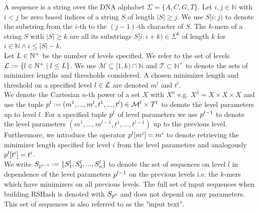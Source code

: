 \documentclass[a4paper,titlepage,onecolumn,oneside,12pt,nenglish,titlepage=firstiscover]{scrbook}
\theoremstyle{plain} %
\theoremstyle{definition} %
\theoremstyle{remark} %
\theoremstyle{plain}
\newcommand{\NN}{\mathbb{N}} %
\newcommand{\minimizerLength}{m}
\newcommand{\threshold}{t}
\newcommand{\level}{l}
\newcommand{\possibleMinimizerLengths}{\mathcal{M}}
\newcommand{\possibleThresholds}{\mathcal{T}}
\begin{document}
\newcommand{\sequences}[1]{S_{\levelParameters{#1}}}
\newcommand{\substring}[3]{#1[#2:#3)}
A sequence is a string over the DNA alphabet $\Sigma = \{A,C,G,T\}$. Let $i,j \in \NN$ with $i < j$ be zero based indices of a string $S$ of length $|S| \geq j$. We use $\substring{S}{i}{j}$ to denote the substring from the $i$-th to the $(j-1)$-th character of $S$.
The $k$-mers of a string $S$ with $|S|\geq k$ are all its substrings $S[i:i+k) \in \Sigma^k$ of length $k$ for $i \in \NN \wedge i \leq |S|-k$.\\
Let $\numberOfLevels \in \NN^+$ be the number of levels specified. We refer to the set of levels $\setOfLevels := \{ \level \in \NN^+ \mid \level \leq \numberOfLevels \}$. We use $\possibleMinimizerLengths \subseteq [1,k) \cap \NN$ and $\possibleThresholds \subset \NN^+$ to denote the sets of minimizer lengths and thresholds considered. A chosen minimizer length and threshold on a specified level $\level \in \setOfLevels$ are denoted $\minimizerLength^\level$ and $\threshold^\level$.\\
We denote the Cartesian $n$-th power of a set $X$ with $X^n$ e.g. $X^3 = X \times X \times X$ and use the tuple $\levelParameters{\level} := (\minimizerLength^1, ..., \minimizerLength^\level, \threshold^1, ..., \threshold^\level) \in \possibleMinimizerLengths^\level \times \possibleThresholds^\level$ to denote the level parameters up to level $\level$. For a specified tuple $\levelParameters{\level}$ of level parameters we use $\levelParameters{\level-1}$ to denote the level parameters $(\minimizerLength^1, ..., \minimizerLength^{\level-1}, \threshold^1, ..., \threshold^{\level-1})$ up to the previous level. Furthermore, we introduce the operator $\parameterAccess{\level}{\minimizerLength}{i} = \minimizerLength^i$ to denote retrieving the minimizer length specified for level $i$ from the level parameters and analogously $\parameterAccess{\level}{\threshold}{i}  = \threshold^i$.\\
We write $\sequences{\level-1} := \{S^\level_1,S^\level_2,...,S^\level_n\}$ to denote the set of sequences on level $\level$ in dependence of the level parameters $\levelParameters{\level-1}$ on the previous levels i.e. the $k$-mers which have \infrequent minimizers on all previous levels. The full set of input sequences when building RSHash is denoted with $\sequences{0}$ and does not depend on any parameters. This set of sequences is also referred to as the "input text".\\
\end{document}
